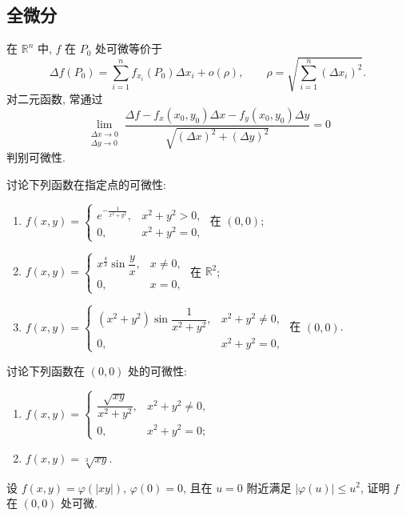 \documentclass[../../数学分析培优讲义.tex]{subfiles}
\begin{document}
\subsection{全微分}

在 $\mathbb{R}^n$ 中, $f$ 在 $P_0$ 处可微等价于
\[
    \Delta f(P_0)=\sum\limits_{i=1}^n f_{x_i}(P_0)\Delta x_i+o(\rho),
    \qquad
    \rho=\sqrt{\sum\limits_{i=1}^n(\Delta x_i)^2}.
\]
对二元函数, 常通过
\[
    \lim\limits_{\substack{\Delta x\to0\\\Delta y\to0}}
    \dfrac{\Delta f-f_x(x_0,y_0)\Delta x-f_y(x_0,y_0)\Delta y}
    {\sqrt{(\Delta x)^2+(\Delta y)^2}}=0
\]
判别可微性.

\begin{example}
讨论下列函数在指定点的可微性:
\begin{enumerate}[label=(\arabic*)]
    \item $\displaystyle f(x,y)=\begin{cases}e^{-\frac{1}{x^2+y^2}},&x^2+y^2>0,\\0,&x^2+y^2=0,\end{cases}$ 在 $(0,0)$;
    \item $\displaystyle f(x,y)=\begin{cases}x^{\frac{4}{3}}\sin\dfrac{y}{x},&x\ne0,\\0,&x=0,\end{cases}$ 在 $\mathbb{R}^2$;
    \item $\displaystyle f(x,y)=\begin{cases}(x^2+y^2)\sin\dfrac{1}{x^2+y^2},&x^2+y^2\ne0,\\0,&x^2+y^2=0,\end{cases}$ 在 $(0,0)$.
\end{enumerate}
\end{example}
\exampleblank

\begin{example}
讨论下列函数在 $(0,0)$ 处的可微性:
\begin{enumerate}[label=(\arabic*)]
    \item $\displaystyle f(x,y)=\begin{cases}\dfrac{\sqrt{xy}}{x^2+y^2},&x^2+y^2\ne0,\\0,&x^2+y^2=0;\end{cases}$
    \item $f(x,y)=\sqrt[3]{xy}$.
\end{enumerate}
\end{example}
\exampleblank

\begin{example}
设 $f(x,y)=\varphi(|xy|)$, $\varphi(0)=0$, 且在 $u=0$ 附近满足 $|\varphi(u)|\leq u^2$, 证明 $f$ 在 $(0,0)$ 处可微.
\end{example}
\exampleblank
\end{document}
